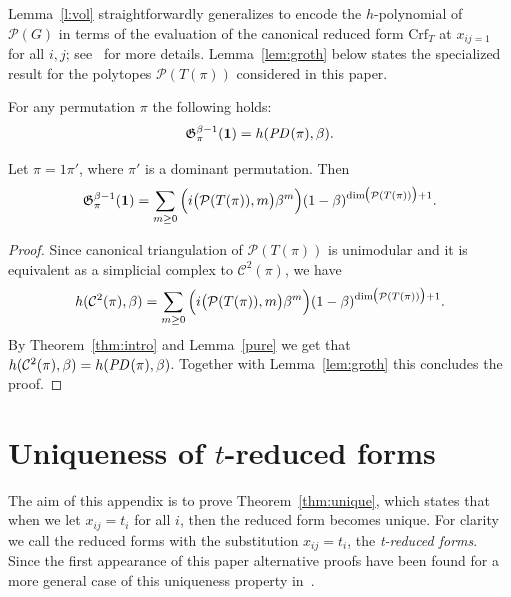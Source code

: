 \documentclass[ALCO,ThmDefs]{cedram}
\numberwithin{equation}{section}
\newcommand*{\Crf}{\mathrm{Crf}}
\newcommand*\C{{\mathcal{C}}}
\renewcommand*\P{{\mathcal{P}}}
\newcommand*\+{\smash{\lower2pt\hbox{\rlap{\vrule height14pt}}\raise2pt\hbox{\rlap{\hskip-3pt \vrule height.4pt depth0pt width14.7pt}}}}
\newcommand*{\MK}{\mkern 2mu}
\DeclareMathOperator{\PD}{\textit{PD}\MK}
\begin{document}
Lemma~\ref{l:vol} straightforwardly generalizes to encode the $h$-polynomial of $\P(G)$ in terms of the evaluation of the canonical reduced form $\Crf_T$ at $x_{ij=1}$ for all $i,j$; see~\cite{root1, groth} for more details. Lemma~\ref{lem:groth} below states the specialized result for the polytopes $\P(T(\pi))$ considered in this paper.

\begin{lemm}\label{lem:groth}
For any permutation $\pi$ the following holds:
\[
\mathfrak{G}_{\pi}^{\beta-1}(\mathbf{1})=h(\PD(\pi), \beta).
\]
\end{lemm}

\begin{theo}\label{thm-ehr}
Let $\pi=1\pi'$, where $\pi'$ is a dominant permutation.
Then
\begin{equation}\label{h-ehrhart}
\mathfrak{G}_{\pi}^{\beta-1}(\mathbf{1})=\sum_{m\geq0}\Big(i\big(\P(T(\pi)), m\big)\beta^m\Big)(1-\beta)^{\dim\hspace{-.07cm}\big(\P(T(\pi))\big)+1}.
\end{equation}
\end{theo}

\begin{proof}
Since canonical triangulation of $\P(T(\pi))$ is unimodular and it is equivalent as a simplicial complex to $\C^2(\pi)$, we have~\cite{Stcom}
\begin{equation}\label{h-ehrhart1}
h(\C^2(\pi), \beta)=\sum_{m\geq0}\Big(i\big(\P(T(\pi)), m\big)\beta^m\Big)(1-\beta)^{\dim\hspace{-.07cm}\big(\P(T(\pi))\big)+1}.
\end{equation}
By Theorem~\ref{thm:intro} and Lemma~\ref{pure} we get that $h(\C^2(\pi), \beta)=h(\PD(\pi), \beta)$. Together with Lemma~\ref{lem:groth} this concludes the proof.
\end{proof}

\appendix
\section{Uniqueness of \texorpdfstring{$t$}{t}-reduced forms}\label{sec:unique}

The aim of this appendix is to prove Theorem~\ref{thm:unique}, which states that when we let $x_{ij}=t_i$ for all $i$, then the reduced form becomes unique. For clarity we call the reduced forms with the substitution $x_{ij}=t_i$, the \emph{t-reduced forms}. Since the first appearance of this paper alternative proofs have been found for a more general case of this uniqueness property in~\cite{darij, groth1}.
\end{document}
